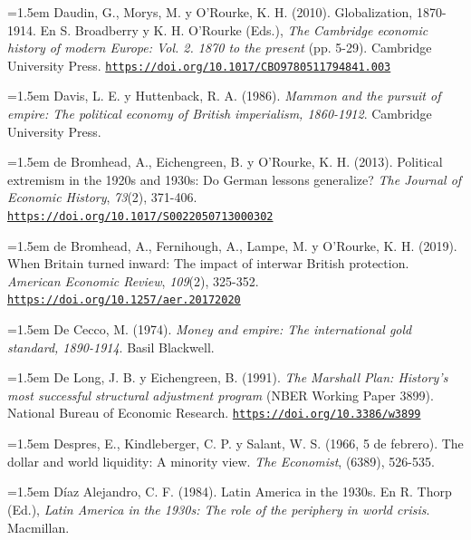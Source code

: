 \documentclass[10pt,a4paper]{article}
\begin{document}
{\sloppy\noindent\hangindent=1.5em Daudin, G., Morys, M. y O'Rourke, K. H. (2010). Globalization, 1870-1914. En S. Broadberry y K. H. O'Rourke (Eds.), \textit{The Cambridge economic history of modern Europe: Vol. 2. 1870 to the present} (pp. 5-29). Cambridge University Press. \href{https://doi.org/10.1017/CBO9780511794841.003}{\nolinkurl{https://doi.org/10.1017/CBO9780511794841.003}}\par}

\noindent\hangindent=1.5em Davis, L. E. y Huttenback, R. A. (1986). \textit{Mammon and the pursuit of empire: The political economy of British imperialism, 1860-1912}. Cambridge University Press.

{\sloppy\noindent\hangindent=1.5em de Bromhead, A., Eichengreen, B. y O'Rourke, K. H. (2013). Political extremism in the 1920s and 1930s: Do German lessons generalize? \textit{The Journal of Economic History}, \textit{73}(2), 371-406. \href{https://doi.org/10.1017/S0022050713000302}{\nolinkurl{https://doi.org/10.1017/S0022050713000302}}\par}

{\sloppy\noindent\hangindent=1.5em de Bromhead, A., Fernihough, A., Lampe, M. y O'Rourke, K. H. (2019). When Britain turned inward: The impact of interwar British protection. \textit{American Economic Review}, \textit{109}(2), 325-352. \href{https://doi.org/10.1257/aer.20172020}{\nolinkurl{https://doi.org/10.1257/aer.20172020}}\par}

\noindent\hangindent=1.5em De Cecco, M. (1974). \textit{Money and empire: The international gold standard, 1890-1914}. Basil Blackwell.

{\sloppy\noindent\hangindent=1.5em De Long, J. B. y Eichengreen, B. (1991). \textit{The Marshall Plan: History's most successful structural adjustment program} (NBER Working Paper 3899). National Bureau of Economic Research. \href{https://doi.org/10.3386/w3899}{\nolinkurl{https://doi.org/10.3386/w3899}}\par}

\noindent\hangindent=1.5em Despres, E., Kindleberger, C. P. y Salant, W. S. (1966, 5 de febrero). The dollar and world liquidity: A minority view. \textit{The Economist}, (6389), 526-535.

{\sloppy\noindent\hangindent=1.5em Díaz Alejandro, C. F. (1984). Latin America in the 1930s. En R. Thorp (Ed.), \textit{Latin America in the 1930s: The role of the periphery in world crisis}. Macmillan.\par}
\end{document}
